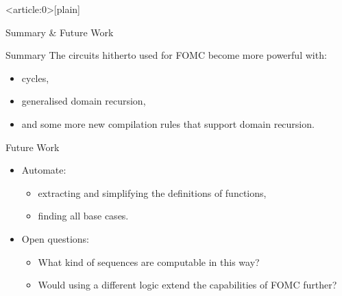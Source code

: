 \documentclass{beamer}
\begin{document}
{ %
    \begin{frame}<article:0>[plain]
     \end{frame}
}

\begin{frame}{Summary \& Future Work}
  \begin{block}{Summary}
    The circuits hitherto used for FOMC become more powerful with:
    \begin{itemize}
    \item cycles,
    \item generalised domain recursion,
    \item and some more new compilation rules that support domain recursion.
    \end{itemize}
  \end{block}
  \begin{block}{Future Work}
    \begin{itemize}
    \item Automate:
      \begin{itemize}
      \item extracting and simplifying the definitions of functions,
      \item finding all base cases.
      \end{itemize}
    \item Open questions:
      \begin{itemize}
      \item What kind of \alert{sequences} are computable in this way?
      \item Would using a \alert{different logic} extend the capabilities of FOMC further?
      \end{itemize}
    \end{itemize}
  \end{block}
\end{frame}
\end{document}
